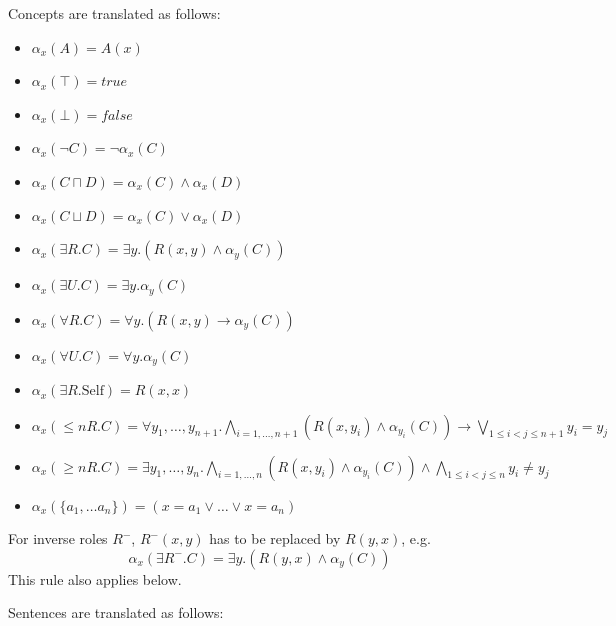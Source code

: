 \documentclass[10pt, a4paper]{isov2}
\begin{document}
Concepts are translated as follows:
\begin{itemize}
 \item $\alpha_x(A) = A(x)$
 \item $\alpha_x(\top) = \mathit{true}$
 \item $\alpha_x(\bot) = \mathit{false}$
 \item $\alpha_x(\lnot C) = \lnot \alpha_x (C)$
 \item $\alpha_x(C \sqcap D) = \alpha_x(C) \land \alpha_x(D)$
 \item $\alpha_x(C \sqcup D) = \alpha_x(C) \lor \alpha_x(D)$ 
 \item $\alpha_x(\exists R.C) = \exists y . (R(x,y) \land \alpha_y(C))$
 \item $\alpha_x(\exists U.C) = \exists y . \alpha_y(C)$
 \item $\alpha_x(\forall R.C) = \forall y . (R(x,y) \rightarrow \alpha_y(C))$
 \item $\alpha_x(\forall U.C) = \forall y . \alpha_y(C)$
 \item $\alpha_x(\exists R.\text{Self}) = R(x,x)$
 \item $\alpha_x(\leq n R. C) = \forall y_1,\ldots,y_{n+1} .  \bigwedge_{i=1,\ldots,n+1}(R(x,y_i) \land \alpha_{y_i}(C)) \rightarrow\bigvee_{1\leq i<j\leq n+1}y_i = y_j$
 \item $\alpha_x(\geq n R. C) = \exists y_1,\ldots,y_n . \bigwedge_{i=1,\ldots,n}(R(x,y_i) \land \alpha_{y_i}(C)) \wedge \bigwedge_{1\leq i<j\leq n}y_i\not= y_j $
 \item $\alpha_x(\{a_1, \ldots a_n \}) = (x=a_1\vee \ldots \vee x=a_n)$
\end{itemize}

For inverse roles $R^-$, $R^-(x,y)$ has to be replaced by $R(y,x)$, e.g.
 $$\alpha_x(\exists R^-.C) = \exists y . (R(y,x) \land \alpha_y(C))$$
This rule also applies below.


Sentences are translated as follows:
\end{document}
